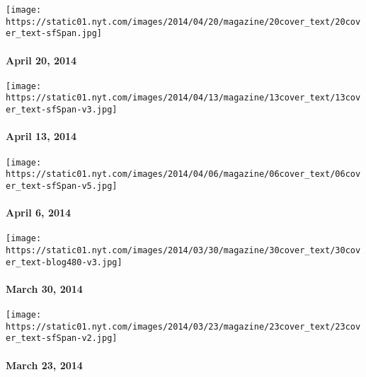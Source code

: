\href{http://www.nytimes.com/indexes/2014/04/20/magazine/index.html}{}

\texttt{[image: https://static01.nyt.com/images/2014/04/20/magazine/20cover\_text/20cover\_text-sfSpan.jpg]}

\hypertarget{april-20-2014}{%
\paragraph{April 20, 2014}\label{april-20-2014}}

\href{http://www.nytimes.com/indexes/2014/04/13/magazine/index.html}{}

\texttt{[image: https://static01.nyt.com/images/2014/04/13/magazine/13cover\_text/13cover\_text-sfSpan-v3.jpg]}

\hypertarget{april-13-2014}{%
\paragraph{April 13, 2014}\label{april-13-2014}}

\href{http://www.nytimes.com/indexes/2014/04/06/magazine/index.html}{}

\texttt{[image: https://static01.nyt.com/images/2014/04/06/magazine/06cover\_text/06cover\_text-sfSpan-v5.jpg]}

\hypertarget{april-6-2014}{%
\paragraph{April 6, 2014}\label{april-6-2014}}

\href{http://www.nytimes.com/indexes/2014/03/30/magazine/index.html}{}

\texttt{[image: https://static01.nyt.com/images/2014/03/30/magazine/30cover\_text/30cover\_text-blog480-v3.jpg]}

\hypertarget{march-30-2014}{%
\paragraph{March 30, 2014}\label{march-30-2014}}

\href{http://www.nytimes.com/indexes/2014/03/23/magazine/index.html}{}

\texttt{[image: https://static01.nyt.com/images/2014/03/23/magazine/23cover\_text/23cover\_text-sfSpan-v2.jpg]}

\hypertarget{march-23-2014}{%
\paragraph{March 23, 2014}\label{march-23-2014}}

